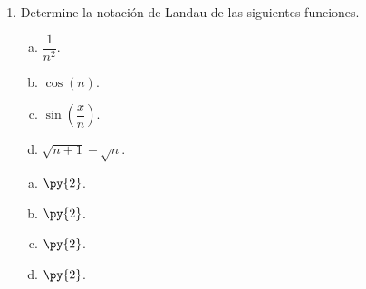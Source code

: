 \documentclass[
	spanish,
	9pt,
	utf8,
	xcolor=table,
	handout,
	aspectratio=1610,
	professionalfonts,
	mathserif,
]{beamer}
\newcounter{savedenum}
\newcommand*{\saveenum}{\setcounter{savedenum}{\theenumi}}
\begin{document}
\begin{frame}

	\begin{enumerate}
		\item
		      Determine la notación de Landau de las siguientes funciones.

		      \begin{multicols}{4}
			      \begin{enumerate}[a)]
				      \item
				            $\dfrac{1}{n^{2}}$.

				      \item
				            $\cos\left(n\right)$.

				      \item
				            $\sin\left(\dfrac{x}{n}\right)$.

				      \item
				            $\sqrt{n+1}-\sqrt{n}$.
			      \end{enumerate}
		      \end{multicols}

		      \begin{solution}
			      \begin{enumerate}[a)]
				      \item
				            $\py{2}$.

				      \item
				            $\py{2}$.

				      \item
				            $\py{2}$.

				      \item
				            $\py{2}$.
			      \end{enumerate}
		      \end{solution}

		      \saveenum
	\end{enumerate}
\end{frame}
\end{document}
